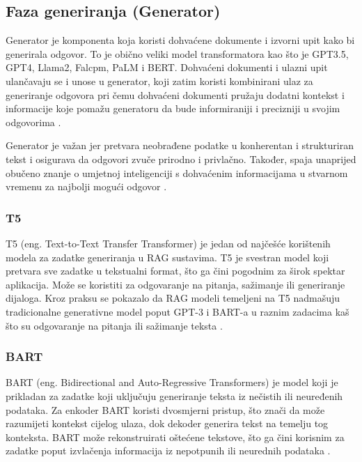 \documentclass[]{foi}
\begin{document}



\subsection{Faza generiranja (Generator)}

Generator je komponenta koja koristi dohvaćene dokumente i izvorni upit kako bi generirala odgovor. To je obično veliki model transformatora kao što je GPT3.5, GPT4, Llama2, Falcpm, PaLM i BERT.
Dohvaćeni dokumenti i ulazni upit ulančavaju se i unose u generator, koji zatim koristi kombinirani ulaz za generiranje odgovora pri čemu dohvaćeni dokumenti pružaju dodatni kontekst i informacije 
koje pomažu generatoru da bude informiraniji i precizniji u svojim odgovorima \cite{redis2025}. 

Generator je važan jer pretvara neobrađene podatke u konherentan i strukturiran tekst i osigurava da odgovori zvuče prirodno i privlačno. Također, spaja unaprijed obučeno znanje o umjetnoj inteligenciji
s dohvaćenim informacijama u stvarnom vremenu za najbolji mogući odgovor \cite{shaheryar2025}. 

\subsubsection{T5}
T5 (eng. Text-to-Text Transfer Transformer) je jedan od najčešće korištenih modela za zadatke generiranja u RAG sustavima. T5 je svestran model koji pretvara sve zadatke u tekstualni format, što ga čini pogodnim za širok spektar aplikacija.
Može se koristiti za odgovaranje na pitanja, sažimanje ili generiranje dijaloga. Kroz praksu se pokazalo da RAG modeli temeljeni na T5 nadmašuju
tradicionalne generativne model poput GPT-3 i BART-a u raznim zadacima kaš što su odgovaranje na pitanja ili sažimanje teksta \cite{gupta2024rag}.

\subsubsection{BART}
BART (eng. Bidirectional and Auto-Regressive Transformers) je model koji je prikladan za zadatke koji uključuju generiranje teksta 
iz nečistih ili neuređenih podataka. Za enkoder BART koristi dvosmjerni pristup, što znači da može razumijeti kontekst cijelog ulaza,
dok dekoder generira tekst na temelju tog konteksta. BART može rekonstruirati oštećene tekstove, što ga čini korisnim za zadatke poput
izvlačenja informacija iz nepotpunih ili neurednih podataka \cite{gupta2024rag}. 
\end{document}
